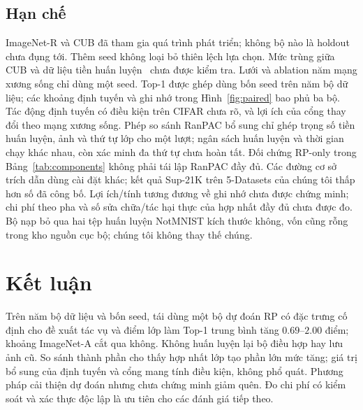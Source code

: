 \documentclass[runningheads]{llncs}
\begin{document}
\subsection{Hạn chế}
\label{sec:limits}

ImageNet-R và CUB đã tham gia quá trình phát triển; không bộ nào là holdout
chưa đụng tới. Thêm seed không loại bỏ thiên lệch lựa chọn. Mức trùng giữa CUB
và dữ liệu tiền huấn luyện~\cite{ref_cub} chưa được kiểm tra. Lưới và ablation
năm mạng xương sống chỉ dùng một seed. Top-1 được ghép dùng bốn seed trên năm
bộ dữ liệu; các khoảng định tuyến và ghi nhớ trong Hình~\ref{fig:paired} bao phủ
ba bộ. Tác động định tuyến có điều kiện trên CIFAR chưa rõ, và lợi ích của cổng
thay đổi theo mạng xương sống.
Phép so sánh RanPAC bổ sung chỉ ghép trọng số tiền huấn luyện, ảnh và thứ tự lớp
cho một lượt; ngân sách huấn luyện và thời gian chạy khác nhau, còn xác minh đa
thứ tự chưa hoàn tất. Đối chứng RP-only trong Bảng~\ref{tab:components} không
phải tái lập RanPAC đầy đủ. Các đường cơ sở trích dẫn dùng cài đặt khác; kết quả
Sup-21K trên 5-Datasets của chúng tôi thấp hơn số đã công bố. Lợi ích/tính tương
đương về ghi nhớ chưa được chứng minh; chi phí theo pha và số sửa chữa/tác hại
thực của hợp nhất đầy đủ chưa được đo. Bộ nạp bỏ qua hai tệp huấn luyện
NotMNIST kích thước không, vốn cũng rỗng trong kho nguồn cục bộ; chúng tôi không
thay thế chúng.

\section{Kết luận}

Trên năm bộ dữ liệu và bốn seed, tái dùng một bộ dự đoán RP có đặc trưng cố
định cho đề xuất tác vụ và điểm lớp làm Top-1 trung bình tăng $0.69$--$2.00$
điểm; khoảng ImageNet-A cắt qua không. Không huấn luyện lại bộ điều hợp hay lưu
ảnh cũ. So sánh thành phần cho thấy hợp nhất lớp tạo phần lớn mức tăng;
giá trị bổ sung của định tuyến và cổng mang tính điều kiện, không phổ quát.
Phương pháp cải thiện dự đoán nhưng chưa chứng minh giảm quên. Đo chi phí có
kiểm soát và xác thực độc lập là ưu tiên cho các đánh giá tiếp theo.
\end{document}
